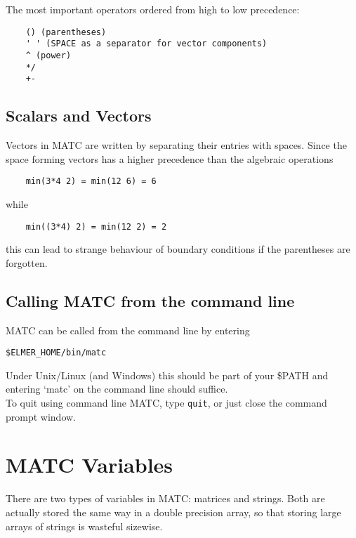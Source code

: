 \noindent The most important operators ordered from high to low precedence:

\begin{verbatim}
    () (parentheses)
    ' ' (SPACE as a separator for vector components)
    ^ (power)
    */
    +-
\end{verbatim}

\subsection{Scalars and Vectors}

Vectors in MATC are written by separating their entries with spaces. Since the space forming vectors has a higher precedence than the algebraic operations

\begin{verbatim}
    min(3*4 2) = min(12 6) = 6
\end{verbatim}

\noindent while

\begin{verbatim}
    min((3*4) 2) = min(12 2) = 2
\end{verbatim}

\noindent this can lead to strange behaviour of boundary conditions if the parentheses are forgotten. 

\subsection{Calling MATC from the command line}

MATC can be called from the command line by entering \begin{verbatim}$ELMER_HOME/bin/matc\end{verbatim} Under Unix/Linux (and Windows) this should be part of your \$PATH and entering `matc' on the command line should suffice.\\

\noindent To quit using command line MATC, type \texttt{quit}, or just close the command prompt window.

\section{MATC Variables}

There are two types of variables in MATC: matrices and strings. 
Both are actually stored the same way in a double precision array, so that storing large arrays of strings is wasteful sizewise. 

